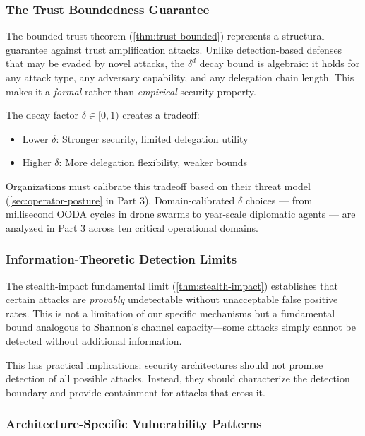 \documentclass[
]{article}
\providecommand{\tightlist}{%
  \setlength{\itemsep}{0pt}\setlength{\parskip}{0pt}}
\begin{document}
\subsubsection{The Trust Boundedness
Guarantee}\label{the-trust-boundedness-guarantee}

The bounded trust theorem (\cref{thm:trust-bounded}) represents a
structural guarantee against trust amplification attacks. Unlike
detection-based defenses that may be evaded by novel attacks, the
\(\delta^d\) decay bound is algebraic: it holds for any attack type, any
adversary capability, and any delegation chain length. This makes it a
\emph{formal} rather than \emph{empirical} security property.

The decay factor \(\delta \in [0, 1)\) creates a tradeoff:

\begin{itemize}
\tightlist
\item
  Lower \(\delta\): Stronger security, limited delegation utility
\item
  Higher \(\delta\): More delegation flexibility, weaker bounds
\end{itemize}

Organizations must calibrate this tradeoff based on their threat model
(\cref{sec:operator-posture} in Part 3). Domain-calibrated \(\delta\)
choices --- from millisecond OODA cycles in drone swarms to year-scale
diplomatic agents --- are analyzed in Part 3 \cite{friedman2026cogsec3}
across ten critical operational domains.

\subsubsection{Information-Theoretic Detection
Limits}\label{information-theoretic-detection-limits}

The stealth-impact fundamental limit (\cref{thm:stealth-impact})
establishes that certain attacks are \emph{provably} undetectable
without unacceptable false positive rates. This is not a limitation of
our specific mechanisms but a fundamental bound analogous to Shannon's
channel capacity---some attacks simply cannot be detected without
additional information.

This has practical implications: security architectures should not
promise detection of all possible attacks. Instead, they should
characterize the detection boundary and provide containment for attacks
that cross it.

\subsubsection{Architecture-Specific Vulnerability
Patterns}\label{architecture-specific-vulnerability-patterns}
\end{document}
